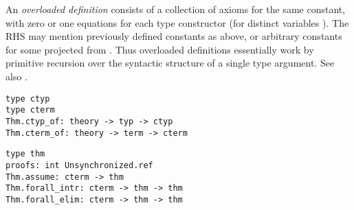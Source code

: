 \begin{isabellebody}
\begin{isamarkuptext}
  An \emph{overloaded definition} consists of a collection of axioms
  for the same constant, with zero or one equations  for each type constructor  (for
  distinct variables ).  The RHS may mention
  previously defined constants as above, or arbitrary constants  for some  projected from .  Thus overloaded definitions essentially work by
  primitive recursion over the syntactic structure of a single type
  argument.  See also \cite[\S4.3]{Haftmann-Wenzel:2006:classes}.%
\end{isamarkuptext}%
\isamarkuptrue%
%
\isadelimmlref
%
\endisadelimmlref
%
\isatagmlref
%
\begin{isamarkuptext}%
\begin{mldecls}
  \verb|type ctyp| \\
  \verb|type cterm| \\
  \verb|Thm.ctyp_of: theory -> typ -> ctyp| \\
  \verb|Thm.cterm_of: theory -> term -> cterm| \\
  \end{mldecls}
  \begin{mldecls}
  \verb|type thm| \\
  \verb|proofs: int Unsynchronized.ref| \\
  \verb|Thm.assume: cterm -> thm| \\
  \verb|Thm.forall_intr: cterm -> thm -> thm| \\
  \verb|Thm.forall_elim: cterm -> thm -> thm| \\

\end{mldecls}
\end{isamarkuptext}
\end{isabellebody}
